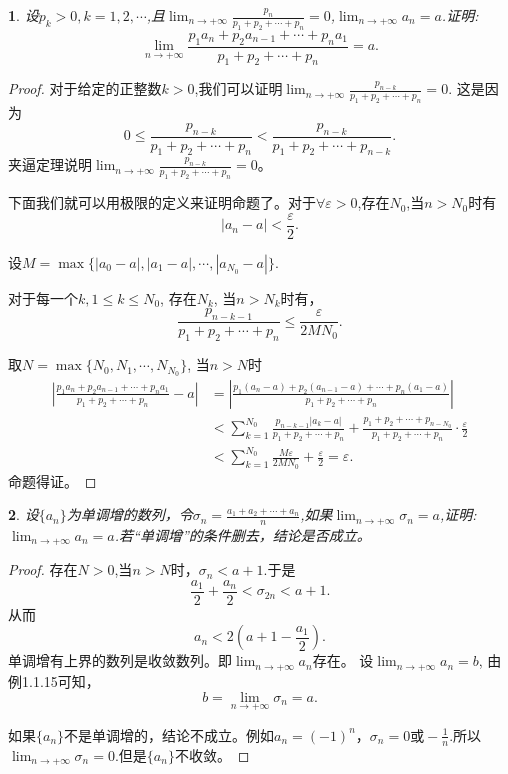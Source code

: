 \documentclass[utf8]{book}
\newtheorem{example}{}[section]             %
\begin{document}
\begin{example}
设$p_k>0, k=1,2,\cdots$,且$\displaystyle\lim_{n\to +\infty}\frac{p_n}{p_1+p_2+\cdots+p_n}=0$,$\displaystyle\lim_{n\to +\infty}a_n=a$.证明:
$$\displaystyle\lim_{n\to +\infty}\frac{p_1a_n+p_2a_{n-1}+\cdots+p_na_1}{p_1+p_2+\cdots+p_n}=a.$$
\end{example}
\begin{proof}
对于给定的正整数$k>0$,我们可以证明$\displaystyle\lim_{n\to +\infty}\frac{p_{n-k}}{p_1+p_2+\cdots+p_n}=0$.
这是因为
$$0\leq \frac{p_{n-k}}{p_1+p_2+\cdots+p_n} < \frac{p_{n-k}}{p_1+p_2+\cdots+p_{n-k}}.$$
夹逼定理说明$\displaystyle\lim_{n\to +\infty}\frac{p_{n-k}}{p_1+p_2+\cdots+p_n}=0$。

下面我们就可以用极限的定义来证明命题了。对于$\forall \varepsilon > 0$,存在$N_0$,当$n>N_0$时有$$\left|a_n-a\right| < \frac{\varepsilon}{2}.$$

设$M = \max\{\left|a_0 -a\right|, \left|a_1 -a\right|, \cdots, \left|a_{N_0} -a\right|\}$.

对于每一个$k, 1\leq k \leq N_0$, 存在$N_k$, 当$n>N_k$时有，
$$\frac{p_{n-k-1}}{p_1+p_2+\cdots+p_n} \leq \frac{\varepsilon}{2MN_0}.$$

取$N=\max\{N_0, N_1, \cdots, N_{N_0}\}$, 当$n>N$时
\begin{equation*}
\begin{split}
\left|\frac{p_1a_n+p_2a_{n-1}+\cdots+p_na_1}{p_1+p_2+\cdots+p_n} - a\right| &= \left|\frac{p_1(a_n-a)+p_2(a_{n-1}-a)+\cdots+p_n(a_1-a)}{p_1+p_2+\cdots+p_n}\right|\\
&<\sum_{k=1}^{N_0} \frac{p_{n-k-1}|a_k - a|}{p_1+p_2+\cdots+p_n} + \frac{p_1 + p_2 + \cdots + p_{n-N_0}}{p_1+p_2+\cdots+p_n}\cdot\frac{\varepsilon}{2} \\
&<\sum_{k=1}^{N_0}\frac{M\varepsilon}{2MN_0} + \frac{\varepsilon}{2} = \varepsilon.
\end{split}
\end{equation*}
命题得证。
\end{proof}
\begin{example}
设$\{a_n\}$为单调增的数列，令$\sigma_n=\displaystyle\frac{a_1+a_2+\cdots+a_n}{n}$,如果$\displaystyle\lim_{n\to +\infty}\sigma_n = a$,证明:$\displaystyle\lim_{n\to +\infty}a_n = a$.若“单调增”的条件删去，结论是否成立。
\end{example}
\begin{proof}
存在$N > 0$,当$n>N$时，$\sigma_n < a+1$.于是
$$\frac{a_1}{2}+\frac{a_n}{2} < \sigma_{2n} < a + 1.$$从而$$a_n < 2\left(a+1-\frac{a_1}{2}\right).$$
单调增有上界的数列是收敛数列。即$\displaystyle\lim_{n\to +\infty}a_n$存在。
设$\displaystyle\lim_{n\to +\infty}a_n=b$, 由例1.1.15可知，
$$b=\displaystyle\lim_{n\to +\infty}\sigma_n = a.$$

如果$\{a_n\}$不是单调增的，结论不成立。例如$a_n=(-1)^n$，$\sigma_n = 0 \text{或} -\frac{1}{n}$.所以$\displaystyle\lim_{n\to +\infty}\sigma_n = 0$.但是$\{a_n\}$不收敛。
\end{proof}
\end{document}
